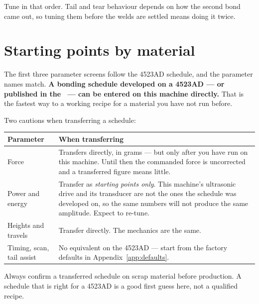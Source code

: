 \begin{wbnote}
Tune in that order. Tail and tear behaviour depends on how the second bond
came out, so tuning them before the welds are settled means doing it twice.
\end{wbnote}

\section{Starting points by material}

The first three parameter screens follow the 4523AD schedule, and the parameter
names match. \textbf{A bonding schedule developed on a 4523AD --- or published
in the \ksmanual\ --- can be entered on this machine directly.} That is the
fastest way to a working recipe for a material you have not run before.

Two cautions when transferring a schedule:

\begin{center}\small
\begin{tabular}{@{}L{34mm}L{88mm}@{}}
\toprule
\textbf{Parameter} & \textbf{When transferring} \\
\midrule
Force &
  Transfers directly, in grams --- but only after you have run 
  on this machine. Until then the commanded force is uncorrected and a
  transferred figure means little. \\
\addlinespace
Power and energy &
  Transfer as \emph{starting points only}. This machine's ultrasonic drive and
  its transducer are not the ones the schedule was developed on, so the same
  numbers will not produce the same amplitude. Expect to re-tune. \\
\addlinespace
Heights and travels &
  Transfer directly. The mechanics are the same. \\
\addlinespace
Timing, scan, tail assist &
  No equivalent on the 4523AD --- start from the factory defaults in
  Appendix~\ref{app:defaults}. \\
\bottomrule
\end{tabular}
\end{center}

\begin{wbwarning}
Always confirm a transferred schedule on scrap material before production. A
schedule that is right for a 4523AD is a good first guess here, not a
qualified recipe.
\end{wbwarning}



